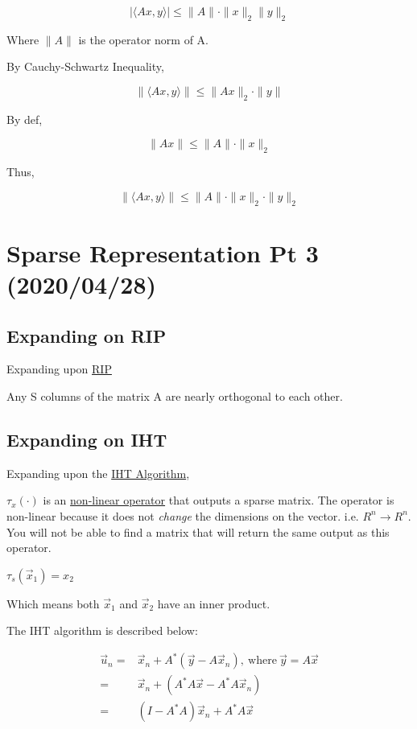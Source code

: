 \documentclass[11pt]{article}
\begin{document}
$$| \langle Ax, y \rangle | \leq \| A\| \cdot \|x\|_2 \|y\|_2$$

Where \(\|A\|\) is the operator norm of A.

By Cauchy-Schwartz Inequality,

$$
\|\langle Ax, y \rangle\| \leq \|Ax\|_2 \cdot \|y\|
$$

By def,

$$
\|Ax\| \leq \|A\| \cdot \|x\|_2
$$

Thus,

$$
\|\langle Ax, y \rangle\| \leq \|A\| \cdot \|x\|_2 \cdot \|y\|_2
$$

\section{Sparse Representation Pt 3 (2020/04/28)}
\label{sec:orge2cf396}

\subsection{Expanding on RIP}
\label{sec:org01c2325}

Expanding upon \hyperref[sec:org159f195]{RIP}

Any S columns of the matrix A are nearly orthogonal to each other.

\subsection{Expanding on IHT}
\label{sec:org4441057}
Expanding upon the \hyperref[sec:org7631229]{IHT Algorithm},

\(\tau_x ( \cdot )\) is an \uline{non-linear operator} that outputs a sparse matrix. The
operator is non-linear because it does not \emph{change} the dimensions on the
vector. i.e. \(R^n \to R^n\). You will not be able to find a matrix that will return the same output as this operator.

\(\tau_s (\vec x_1) = x_2\)

Which means both \(\vec x_1\) and \(\vec x_2\) have an inner product.

The IHT algorithm is described below:

\begin{subequations}
\label{first:main2}
\begin{align}
\vec u_n = & \vec x_n + A^* (\vec y - A \vec x_n), \ \text{where} \ \vec y = A \vec x\\
= & \vec x_n + (A^* A \vec x - A^* A \vec x_n)\\
= & (I - A^* A)\vec x_n + A^* A \vec x
\end{align}
\end{subequations}
\end{document}
